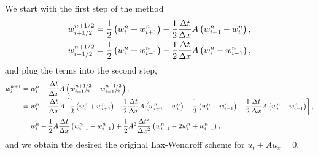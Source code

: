 \begin{questions}

\begin{solution}
We start with the first step of the method
\begin{align*}
w_{i+1/2}^{n+1/2}&=\frac{1}{2}\left(w_i^n+w_{i+1}^n\right)-\frac{1}{2}\frac{\Delta t}{\Delta x}A\left(w_{i+1}^n-w_i^n\right),\\
w_{i-1/2}^{n+1/2}&=\frac{1}{2}\left(w_i^n+w_{i-1}^n\right)-\frac{1}{2}\frac{\Delta t}{\Delta x}A\left(w_{i}^n-w_{i-1}^n\right),
\end{align*}
and plug the terms into the second step,
\begin{align*}
w_i^{n+1}&=w_i^n-\frac{\Delta t}{\Delta x}A\left(w_{i+1/2}^{n+1/2}-w_{i-1/2}^{n+1/2}\right),\\
&=w_i^n-\frac{\Delta t}{\Delta x}A\left[\frac{1}{2}\left(w_i^n+w_{i+1}^n\right)-\frac{1}{2}\frac{\Delta t}{\Delta x}A\left(w_{i+1}^n-w_i^n\right)-\frac{1}{2}\left(w_i^n+w_{i-1}^n\right)+\frac{1}{2}\frac{\Delta t}{\Delta x}A\left(w_{i}^n-w_{i-1}^n\right)\right],\\
&=w_i^n-\frac{1}{2} A\frac{\Delta t}{\Delta x}\left(w_{i+1}^n-w_{i-1}^n\right)+\frac{1}{2} A^2\frac{\Delta t^2}{\Delta x^2}\left(w_{i+1}^n-2w_i^n+w_{i-1}^n\right),
\end{align*}
and we obtain the desired the original Lax-Wendroff scheme for $u_t + A u_x = 0$.
\end{solution}
\end{questions}
